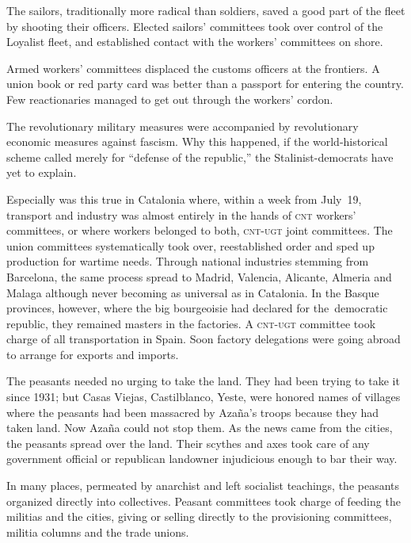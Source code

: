 The sailors, traditionally more radical than soldiers, saved a good part of the fleet by shooting their officers. Elected sailors’ committees took over control of the Loyalist fleet, and established contact with the workers’ committees on shore.

Armed workers’ committees displaced the customs officers at the frontiers. A union book or red party card was better than a passport for entering the country. Few reactionaries managed to get out through the workers’ cordon.
\nowidow

The revolutionary military measures were accompanied by revolutionary economic measures against fascism. Why this happened, if the world-historical scheme called merely for ``defense of the republic,'' the Stalinist-democrats have yet to explain.

Especially was this true in Catalonia where, within a week from July~19, transport and industry was almost entirely in the hands of \textsc{cnt} workers’ committees, or where workers belonged to both, \textsc{cnt-ugt} joint committees. The union committees systematically took over, reestablished order and sped up production for wartime needs. Through national industries stemming from Barcelona, the same process spread to Madrid, Valencia, Alicante, Almeria and Malaga although never becoming as universal as in Catalonia. In the Basque provinces, however, where the big bourgeoisie had declared for the~democratic republic, they remained masters in the factories. A \textsc{cnt-ugt} committee took charge of all transportation in Spain. Soon factory delegations were going abroad to arrange for exports and imports.

The peasants needed no urging to take the land. They had been trying to take it since 1931; but Casas Viejas, Castilblanco, Yeste, were honored names of villages where the peasants had been massacred by Azaña’s troops because they had taken land. Now Azaña could not stop them. As the news came from the cities, the peasants spread over the land. Their scythes and axes took care of any government official or republican landowner injudicious enough to bar their way.

In many places, permeated by anarchist and left socialist teachings, the peasants organized directly into collectives. Peasant committees took charge of feeding the militias and the cities, giving or selling directly to the provisioning committees, militia columns and the trade unions.

